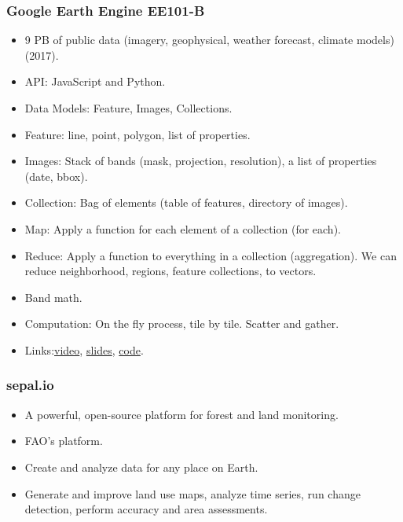 \documentclass{beamer}
\begin{document}
\begin{frame}[t, allowframebreaks]
    \frametitle{Google Earth Engine EE101-B}
    \begin{itemize}
        \item 9 PB of public data (imagery, geophysical, weather forecast, 
            climate models) (2017).
        \item API: JavaScript and Python.
        \item Data Models: Feature,  Images, Collections.
        \item Feature: line, point, polygon, list of properties.
        \item Images: Stack of bands (mask, projection, resolution), a list of 
            properties (date, bbox).
            \item Collection: Bag of elements (table of features, directory of
            images).
        \item Map: Apply a function for each element of a collection (for each).
        \item Reduce: Apply a function to everything in a collection 
            (aggregation). We can reduce neighborhood, regions, feature 
            collections, to vectors.
        \item Band math.
        \item Computation: On the fly process, tile by tile. Scatter and 
            gather.
        \item Links:\href{https://youtu.be/m1ejxSi3l8s}{video}, 
            \href{goo.gl/ZUqPXz}{slides},
            \href{goo.gl/01kki0}{code}.
    \end{itemize}
\end{frame}



\begin{frame}[t, allowframebreaks]
    \frametitle{sepal.io}
    \begin{itemize}
        \item A powerful, open-source platform for forest and land monitoring.
        \item FAO's platform.
        \item Create and analyze data for any place on Earth.
        \item Generate and improve land use maps, analyze time series, run
            change detection, perform accuracy and area assessments.
    \end{itemize}
\end{frame}
\end{document}
